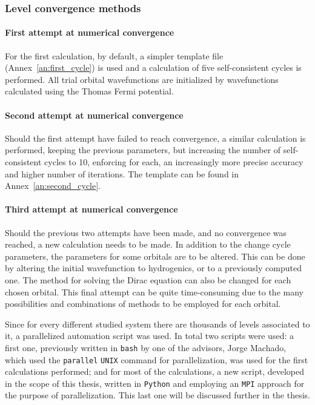 \subsubsection{Level convergence methods}

\paragraph{First attempt at numerical convergence}
For the first calculation, by default, a simpler template file (Annex~\ref{an:first_cycle}) is used and a calculation of five self-consistent cycles is performed. All  trial orbital wavefunctions are initialized by wavefunctions calculated using the Thomas Fermi potential.





\paragraph{Second attempt at numerical convergence}
Should the first attempt have failed to reach convergence, a similar calculation is performed, keeping the previous parameters, but increasing the number of self-consistent cycles to 10, enforcing for each, an increasingly more precise accuracy and higher number of iterations. The template can be found in Annex~\ref{an:second_cycle}.


\paragraph{Third attempt at numerical convergence}
Should the previous two attempts have been made, and no convergence was reached, a new calculation needs to be made. In addition to the change cycle parameters, the parameters for some orbitals are to be altered. This can be done by altering the initial wavefunction to hydrogenics, or to a previously computed one. The method for solving the Dirac equation can also be changed for each chosen orbital. This final attempt can be quite time-consuming due to the many possibilities and combinations of methods to be employed for each orbital.


Since for every different studied system there are thousands of levels associated to it, a parallelized automation script was used. In total two scripts were used: a first one, previously written in \verb|bash| by one of the advisors, Jorge Machado, which used the \verb|parallel| \verb|UNIX| command  for parallelization, was used for the first calculations performed; and for most of the calculations, a new script, developed in the scope of this thesis, written in \verb|Python| and employing an \verb|MPI| approach for the purpose of parallelization. This last one will be discussed further in the thesis.

